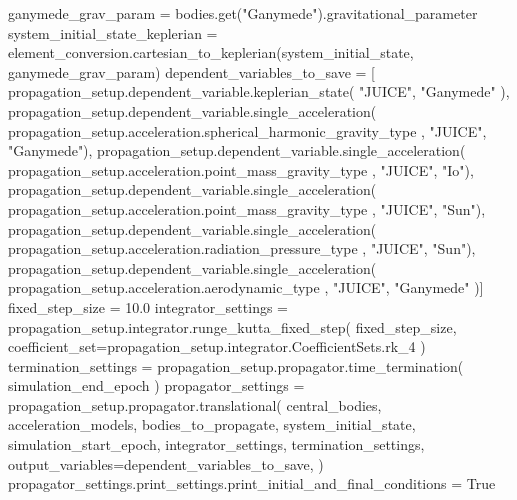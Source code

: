{}ganymede_grav_param = bodies.get("Ganymede").gravitational_parameter\markdownRendererInterblockSeparator
{}
\markdownRendererSectionEnd \markdownRendererSectionBegin
{}\markdownRendererInterblockSeparator
{}
\markdownRendererSectionEnd \markdownRendererSectionBegin
{}\markdownRendererInterblockSeparator
{}system_initial_state_keplerian = element_conversion.cartesian_to_keplerian(system_initial_state, ganymede_grav_param)\markdownRendererInterblockSeparator
{}
\markdownRendererSectionEnd \markdownRendererSectionBegin
{}\markdownRendererInterblockSeparator
{}
\markdownRendererSectionEnd \markdownRendererSectionBegin
{}\markdownRendererInterblockSeparator
{}dependent_variables_to_save = [ propagation_setup.dependent_variable.keplerian_state( "JUICE", "Ganymede" ), propagation_setup.dependent_variable.single_acceleration( propagation_setup.acceleration.spherical_harmonic_gravity_type , "JUICE", "Ganymede"), propagation_setup.dependent_variable.single_acceleration( propagation_setup.acceleration.point_mass_gravity_type , "JUICE", "Io"), propagation_setup.dependent_variable.single_acceleration( propagation_setup.acceleration.point_mass_gravity_type , "JUICE", "Sun"), propagation_setup.dependent_variable.single_acceleration( propagation_setup.acceleration.radiation_pressure_type , "JUICE", "Sun"), propagation_setup.dependent_variable.single_acceleration( propagation_setup.acceleration.aerodynamic_type , "JUICE", "Ganymede" )]\markdownRendererInterblockSeparator
{}
\markdownRendererSectionEnd \markdownRendererSectionBegin
{}\markdownRendererInterblockSeparator
{}fixed_step_size = 10.0 integrator_settings = propagation_setup.integrator.runge_kutta_fixed_step( fixed_step_size, coefficient_set=propagation_setup.integrator.CoefficientSets.rk_4 )\markdownRendererInterblockSeparator
{}
\markdownRendererSectionEnd \markdownRendererSectionBegin
{}\markdownRendererInterblockSeparator
{}termination_settings = propagation_setup.propagator.time_termination( simulation_end_epoch ) propagator_settings = propagation_setup.propagator.translational( central_bodies, acceleration_models, bodies_to_propagate, system_initial_state, simulation_start_epoch, integrator_settings, termination_settings, output_variables=dependent_variables_to_save, ) propagator_settings.print_settings.print_initial_and_final_conditions = True\markdownRendererInterblockSeparator
